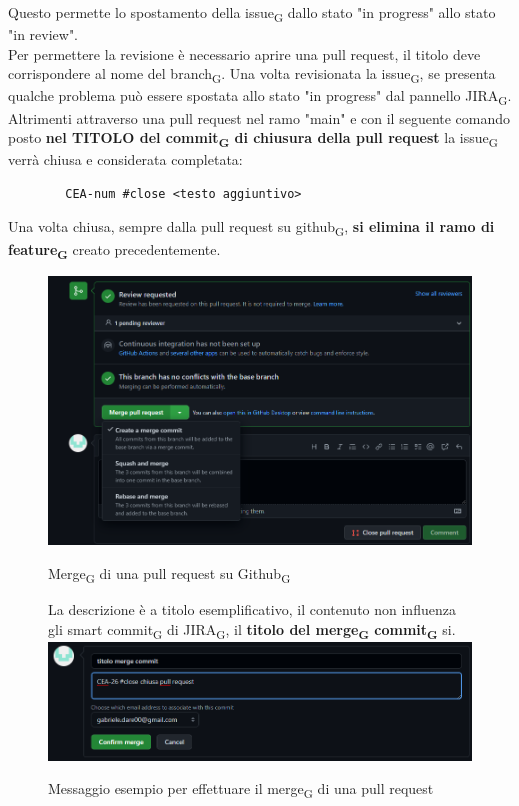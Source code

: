	Questo permette lo spostamento della issue\textsubscript{G} dallo stato "in progress" allo stato "in review".\\
	Per permettere la revisione è necessario aprire una pull request, il titolo deve corrispondere al nome del branch\textsubscript{G}.
	Una volta revisionata la issue\textsubscript{G}, se presenta qualche problema può essere spostata allo stato "in progress" dal pannello JIRA\textsubscript{G}. Altrimenti attraverso una pull request nel ramo "main" e con il seguente comando posto \textbf{nel TITOLO del commit\textsubscript{G} di chiusura della pull request} la issue\textsubscript{G} verrà chiusa e considerata completata:
	\begin{lstlisting}
		CEA-num #close <testo aggiuntivo>
	\end{lstlisting}
	Una volta chiusa, sempre dalla pull request su github\textsubscript{G}, \textbf{si elimina il ramo di feature\textsubscript{G}} creato precedentemente.
	\begin{figure}[ht!]
		\includegraphics[width=15cm]{img/git_pull_request.png}
		\caption{Merge\textsubscript{G} di una pull request su Github\textsubscript{G}}
		La descrizione è a titolo esemplificativo, il contenuto non influenza gli smart commit\textsubscript{G} di JIRA\textsubscript{G}, il \textbf{titolo del merge\textsubscript{G} commit\textsubscript{G}} si.
		\newline \includegraphics[width=15cm]{img/git_pull_request_commit.png}
		\caption{Messaggio esempio per effettuare il merge\textsubscript{G} di una pull request}
	\end{figure}
	\clearpage

